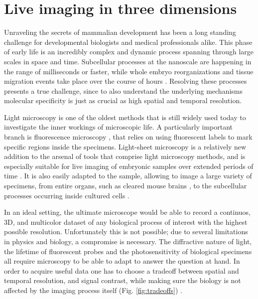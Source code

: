 

\chapter{Live imaging in three dimensions}

\graphicspath{{./figures/1_spim/}}

Unraveling the secrets of mammalian development has been a long standing challenge for developmental biologists and medical professionals alike. 
This phase of early life is an incredibly complex and dynamic process spanning through large scales in space and time. Subcellular processes at the nanoscale are happening in the range of milliseconds or faster, while whole embryo reorganizations and tissue migration events take place over the course of hours \cite{gilbert_developmental_2013}. Resolving these processes presents a true challenge, since to also understand the underlying mechanisms molecular specificity is just as crucial as high spatial and temporal resolution.

Light microscopy is one of the oldest methods that is still widely used today to investigate the inner workings of microscopic life. A particularly important branch is fluorescence microscopy \cite{diaspro_optical_2011}, that relies on using fluorescent labels to mark specific regions inside the specimens. Light-sheet microscopy is a relatively new addition to the arsenal of tools that comprise light microscopy methods, and is especially suitable for live imaging of embryonic samples over extended periods of time \cite{krzic_multiview_2012,tomer_quantitative_2012}. It is also easily adapted to the sample, allowing to image a large variety of specimens, from entire organs, such as cleared mouse brains \cite{dodt_ultramicroscopy:_2007}, to the subcellular processes occurring inside cultured cells \cite{chen_lattice_2014}.

In an ideal setting, the ultimate microscope would be able to record a continuos, 3D, and multicolor dataset of any biological process of interest with the highest possible resolution. Unfortunately this is not possible; due to several limitations in physics and biology, a compromise is necessary. The diffractive nature of light, the lifetime of fluorescent probes and the photosensitivity of biological specimens all require microscopy to be able to adapt to answer the question at hand. In order to acquire useful data one has to choose a tradeoff between spatial and temporal resolution, and signal contrast, while making sure the biology is not affected by the imaging process itself (Fig. \ref{fig:tradeoffs}) \cite{laissue_assessing_2017}. 

